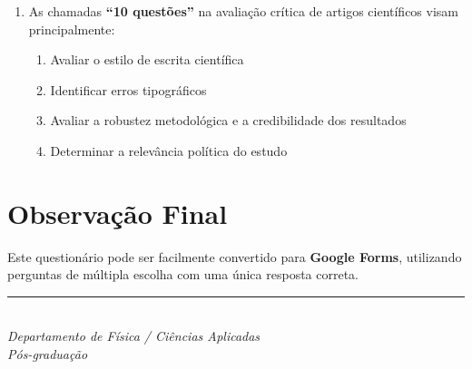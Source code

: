 \documentclass[12pt,a4paper]{article}
\begin{document}
\begin{enumerate}[label=\textbf{Q\arabic*.}]
\item As chamadas \textbf{“10 questões”} na avaliação crítica de artigos científicos visam principalmente:
\begin{enumerate}[label=\alph*)]
\item Avaliar o estilo de escrita científica  
\item Identificar erros tipográficos  
\item Avaliar a robustez metodológica e a credibilidade dos resultados  
\item Determinar a relevância política do estudo  
\end{enumerate}

\end{enumerate}

\vspace{0.7cm}

\section*{Observação Final}
Este questionário pode ser facilmente convertido para \textbf{Google Forms}, utilizando perguntas de múltipla escolha com uma única resposta correta.

\vspace{0.5cm}

\begin{center}
\rule{0.5\linewidth}{0.4pt}\\
\textit{Departamento de Física / Ciências Aplicadas}\\
\textit{Pós-graduação}
\end{center}
\end{document}
